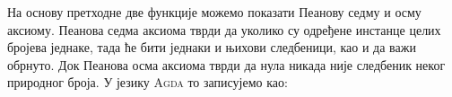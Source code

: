 На основу претходне две функције можемо показати Пеанову седму и осму аксиому. Пеанова седма аксиома тврди да уколико су одређене инстанце целих бројева једнаке, тада ће бити једнаки и њихови следбеници, као и да важи обрнуто. Док Пеанова осма аксиома тврди да нула никада није следбеник неког природног броја. У језику \textsc{Agda} то записујемо као: 
\begin{code}%
\>[0]\AgdaSpace{}%
\AgdaSymbol{:}\AgdaSpace{}%
\AgdaSymbol{(}\AgdaSpace{}%
\AgdaSpace{}%
\AgdaSymbol{:}\AgdaSpace{}%
\AgdaSymbol{)}\AgdaSpace{}%
\AgdaSpace{}%
\AgdaSpace{}%
\AgdaSpace{}%
\AgdaOperator{\AgdaFunction{==}}\AgdaSpace{}%
\AgdaSpace{}%
\AgdaSpace{}%
\AgdaSpace{}%
\AgdaSpace{}%
\AgdaOperator{\AgdaFunction{==}}\AgdaSpace{}%
\<%
\\
\>[0]\AgdaSpace{}%
\AgdaSpace{}%
\AgdaSpace{}%
\AgdaSpace{}%
\AgdaSymbol{=}\AgdaSpace{}%
\AgdaSpace{}%
\AgdaSpace{}%
\AgdaSpace{}%
\AgdaSymbol{(}\AgdaSpace{}%
\AgdaSymbol{)}\<%
\\
%
\\[\AgdaEmptyExtraSkip]%
\>[0]\AgdaSpace{}%
\AgdaSymbol{:}\AgdaSpace{}%
\AgdaSymbol{(}\AgdaSpace{}%
\AgdaSpace{}%
\AgdaSymbol{:}\AgdaSpace{}%
\AgdaSymbol{)}\AgdaSpace{}%
\AgdaSpace{}%
\AgdaSymbol{(}\AgdaSpace{}%
\AgdaOperator{\AgdaFunction{==}}\AgdaSpace{}%
\AgdaSymbol{)}\AgdaSpace{}%
\AgdaSpace{}%
\AgdaSymbol{(}\AgdaSpace{}%
\AgdaSpace{}%
\AgdaOperator{\AgdaFunction{==}}\AgdaSpace{}%
\AgdaSpace{}%
\AgdaSymbol{)}\<%
\\
\>[0]\AgdaSpace{}%
\AgdaSpace{}%
\AgdaSpace{}%
\AgdaSymbol{=}\AgdaSpace{}%
\AgdaSpace{}%
\AgdaSpace{}%
\AgdaOperator{\AgdaInductiveConstructor{,}}\AgdaSpace{}%
\AgdaSpace{}%
\AgdaSpace{}%
\<%
\\
%
\\[\AgdaEmptyExtraSkip]%
\>[0]\AgdaSpace{}%
\AgdaSymbol{:}\AgdaSpace{}%
\AgdaSymbol{(}\AgdaSpace{}%
\AgdaSymbol{:}\AgdaSpace{}%
\AgdaSymbol{)}\AgdaSpace{}%
\AgdaSpace{}%
\AgdaSpace{}%
\AgdaSymbol{(}\AgdaSpace{}%
\AgdaOperator{\AgdaFunction{==}}\AgdaSpace{}%
\AgdaSpace{}%
\AgdaSymbol{)}\<%
\\
\>[0]\AgdaSpace{}%
\AgdaSpace{}%
\AgdaSymbol{=}\AgdaSpace{}%
\<%
\end{code}

